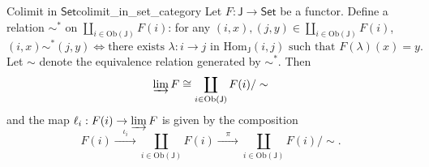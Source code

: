 \begin{example}{Colimit in $\mathsf{Set}$}{colimit_in_set_category}
    Let $F:\mathsf{J}\to \mathsf{Set}$ be a functor. Define a relation $\sim^*$ on $\coprod\limits_{i\in \mathrm{Ob}(\mathsf{J})}F(i)$: for any $(i,x),(j,y)\in \coprod\limits_{i\in \mathrm{Ob}(\mathsf{J})}F(i)$,
    \[
        (i,x)\sim^* (j,y)\iff \text{there exists }\lambda:i\to j\text{ in }\mathrm{Hom}_\mathsf{J}(i,j)\text{ such that }F(\lambda)(x)=y.
    \]
    Let $\sim$ denote the equivalence relation generated by $\sim^*$. Then 
    \[
        \varinjlim F\cong\coprod_{i\in \mathrm{Ob}(\mathsf{J})}F(i)/\sim
    \]
    and the map $\ell_i:F(i)\to \varinjlim F$ is given by the composition
    \[
        F(i)\xrightarrow{\quad\iota_i\quad}\coprod_{i\in \mathrm{Ob}(\mathsf{J})}F(i)\xrightarrow{\quad\pi\quad}\coprod_{i\in \mathrm{Ob}(\mathsf{J})}F(i)/\sim.
    \]
\end{example}

